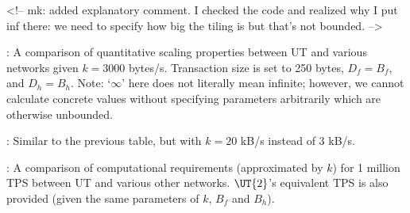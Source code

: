 
<!--
mk: added explanatory comment. I checked the code and realized why I put inf there: we need to specify how big the tiling is but that's not bounded.
-->


: A comparison of quantitative scaling properties between UT and various networks given $k = 3000$ bytes/s. Transaction size is set to 250 bytes, $D_f = B_f$, and $D_h = B_h$.
Note: `$\infty$' here does not literally mean infinite; however, we cannot calculate concrete values without specifying parameters arbitrarily which are otherwise unbounded.


: Similar to the previous table, but with $k = 20$ kB/s instead of 3 kB/s.


: A comparison of computational requirements (approximated by $k$) for 1 million TPS between UT and various other networks. $\UT{2}$'s equivalent TPS is also provided (given the same parameters of $k$, $B_f$ and $B_h$).

